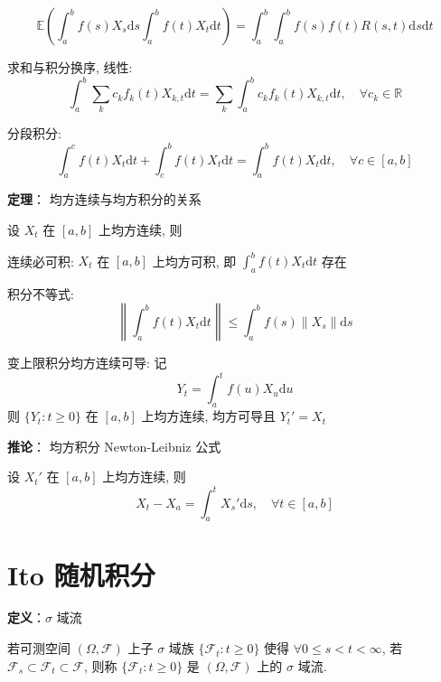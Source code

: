 \documentclass[openany]{ctexbook}
\theoremstyle{kaiti}
\theoremstyle{normal}
\begin{document}
\begin{equation}
  \mathbb{E}\left(\int_a^bf(s)X_s\mathrm{d}s\int_a^bf(t)X_t\mathrm{d}t\right)=\int_a^b\int_a^bf(s)f(t)R(s,t)\mathrm{d}s\mathrm{d}t
\end{equation}


求和与积分换序, 线性:
\begin{equation}
  \int_a^b\sum_kc_kf_k(t)X_{k,t}\mathrm{d}t=\sum_k\int_a^bc_kf_k(t)X_{k,t}\mathrm{d}t,\quad\forall c_k\in\mathbb{R}
\end{equation}


分段积分:
\begin{equation}
  \int_a^cf(t)X_t\mathrm{d}t+\int_c^bf(t)X_t\mathrm{d}t=\int_a^bf(t)X_t\mathrm{d}t,\quad\forall c\in[a,b]
\end{equation}


\textbf{定理}： 均方连续与均方积分的关系

设 $X_t$ 在 $[a,b]$ 上均方连续, 则

连续必可积: $X_t$ 在 $[a,b]$ 上均方可积, 即 $\displaystyle\int_a^bf(t)X_t\mathrm{d}t$ 存在

积分不等式:
\begin{equation}
  \left\|\int_a^bf(t)X_t\mathrm{d}t\right\|\leqslant\int_a^bf(s)\|X_s\|\mathrm{d}s
\end{equation}


变上限积分均方连续可导: 记
\begin{equation}
  Y_t=\int_a^tf(u)X_u\mathrm{d}u
\end{equation}
 则 $\{Y_t:t\geqslant0\}$ 在 $[a,b]$ 上均方连续, 均方可导且 $Y_t'=X_t$

\textbf{推论}： 均方积分 Newton-Leibniz 公式

设 $X_t'$ 在 $[a,b]$ 上均方连续, 则
\begin{equation}
  X_t-X_a=\int_a^tX_s'\mathrm{d}s,\quad\forall t\in[a,b]
\end{equation}


\section{Ito 随机积分}

\textbf{定义}：$\sigma$ 域流

若可测空间 $(\Omega,\mathcal{F})$ 上子 $\sigma$ 域族 $\{\mathcal{F}_t:t\geqslant0\}$ 使得 $\forall0\leqslant s<t<\infty$, 若 $\mathcal{F}_s\subset\mathcal{F}_t\subset\mathcal{F}$, 则称 $\{\mathcal{F}_t:t\geqslant0\}$ 是 $(\Omega,\mathcal{F})$ 上的 $\sigma$ 域流.
\end{document}
